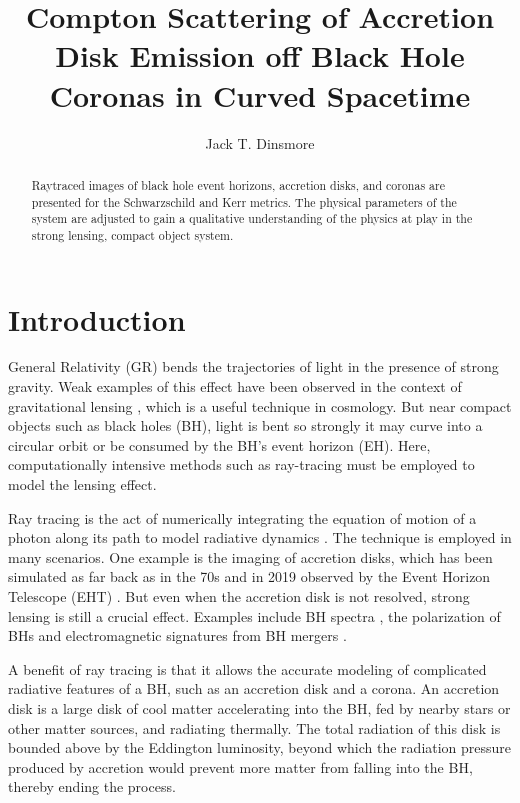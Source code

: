 \documentclass[twocolumn,twocolappendix]{aastex631}
\begin{document}
\author{Jack T. Dinsmore}
\title{Compton Scattering of Accretion Disk Emission off Black Hole Coronas in Curved Spacetime}

\begin{abstract}
  Raytraced images of black hole event horizons, accretion disks, and coronas are presented for the Schwarzschild and Kerr metrics. The physical parameters of the system are adjusted to gain a qualitative understanding of the physics at play in the strong lensing, compact object system.
\end{abstract}

\section{Introduction}

General Relativity (GR) bends the trajectories of light in the presence of strong gravity. Weak examples of this effect have been observed in the context of gravitational lensing \citep{blandford1992cosmological}, which is a useful technique in cosmology. But near compact objects such as black holes (BH), light is bent so strongly it may curve into a circular orbit or be consumed by the BH's event horizon (EH). Here, computationally intensive methods such as ray-tracing must be employed to model the lensing effect.

Ray tracing is the act of numerically integrating the equation of motion of a photon along its path to model radiative dynamics \citep{vincent2011gyoto}. The technique is employed in many scenarios. One example is the imaging of accretion disks, which has been simulated as far back as in the 70s \citep{luminet1979image} and in 2019 observed by the Event Horizon Telescope (EHT) \citep{collaboration2019first}. But even when the accretion disk is not resolved, strong lensing is still a crucial effect. Examples include BH spectra \citep{cunningham1975effects}, the polarization of BHs \citep{dovvciak2008thermal} and electromagnetic signatures from BH mergers \citep{d2018electromagnetic}.

A benefit of ray tracing is that it allows the accurate modeling of complicated radiative features of a BH, such as an accretion disk and a corona. An accretion disk is a large disk of cool matter accelerating into the BH, fed by nearby stars or other matter sources, and radiating thermally. The total radiation of this disk is bounded above by the Eddington luminosity, beyond which the radiation pressure produced by accretion would prevent more matter from falling into the BH, thereby ending the process.
\end{document}
